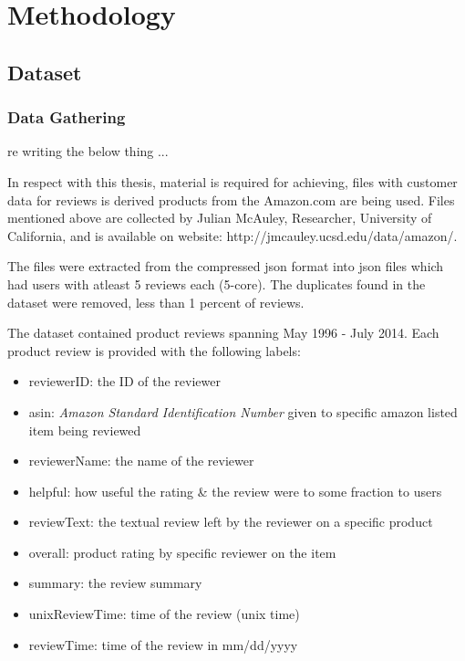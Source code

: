 \chapter{Methodology}

\section{Dataset}

\subsection{Data Gathering}

re writing the below thing ...

In respect with this thesis, material is required for achieving, files with customer data for reviews is derived products from the Amazon.com are being used. Files mentioned above are collected by Julian McAuley, Researcher, University of California, and is available on website: http://jmcauley.ucsd.edu/data/amazon/.

The files were extracted from the compressed json format into json files which had users with atleast 5 reviews each (5-core). The duplicates found in the dataset were removed, less than 1 percent of reviews.

The dataset contained product reviews spanning May 1996 - July 2014. Each product review is provided with the following labels:
\begin{itemize}
\item reviewerID: the ID of the reviewer
\item asin: \textit{Amazon Standard Identification Number} given to specific amazon listed item being reviewed
\item reviewerName: the name of the reviewer
\item helpful: how useful the rating \& the review were to some fraction to users
\item reviewText: the textual review left by the reviewer on a specific product
\item overall: product rating by specific reviewer on the item
\item summary: the review summary
\item unixReviewTime: time of the review (unix time)
\item reviewTime: time of the review in mm/dd/yyyy
\end{itemize}

